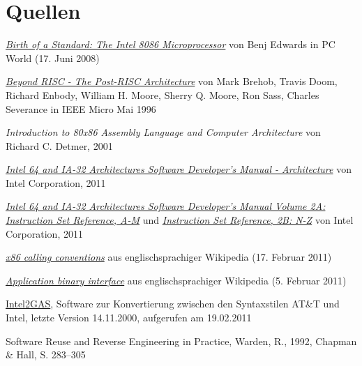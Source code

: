 \section{Quellen}

\begin{thebibliography}{9}

  \href{http://www.pcworld.com/article/146957/birth_of_a_standard_the_intel_8086_microprocessor.html}{
  \emph{Birth of a Standard: The Intel 8086 Microprocessor}}
    von Benj Edwards
    in PC World (17. Juni 2008)


    \href{http://www.cse.msu.edu/~enbody/postrisc/postrisc2.htm}{\emph{Beyond RISC - The Post-RISC Architecture}}
    von Mark Brehob, Travis Doom, Richard Enbody, William H. Moore, Sherry Q. Moore, Ron Sass, Charles Severance
    in IEEE Micro Mai 1996

    \emph{Introduction to 80x86 Assembly Language and Computer Architecture}
    von Richard C. Detmer,
    2001

    \href{http://www.intel.com/Assets/PDF/manual/253665.pdf}{
    \emph{Intel 64 and IA-32 Architectures Software Developer's Manual - Architecture}}
    von Intel Corporation,
    2011

    \href{http://www.intel.com/Assets/PDF/manual/253666.pdf}{
    \emph{Intel 64 and IA-32 Architectures Software Developer's Manual Volume 2A: Instruction Set Reference, A-M}} und
    \href{http://www.intel.com/Assets/PDF/manual/253667.pdf}{
    \emph{Instruction Set Reference, 2B: N-Z}}  von Intel Corporation,
    2011

    \href{https://secure.wikimedia.org/wikipedia/en/w/index.php?title=X86_calling_conventions&oldid=414385219}{\emph{x86 calling conventions}} aus englischsprachiger Wikipedia (17. Februar 2011)

    \href{https://secure.wikimedia.org/wikipedia/en/w/index.php?title=Application_binary_interface&oldid=412119478}{\emph{Application binary interface}} aus englischsprachiger Wikipedia (5. Februar 2011)

    \href{http://www.niksula.hut.fi/~mtiihone/intel2gas/}{Intel2GAS}, Software zur Konvertierung zwischen den Syntaxstilen AT\&T und Intel, letzte Version 14.11.2000, aufgerufen am 19.02.2011

 Software Reuse and Reverse Engineering in Practice, Warden, R., 1992, Chapman \& Hall, S. 283–305


\end{thebibliography}
